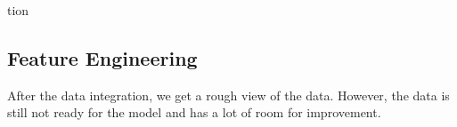 tion\documentclass[8pt]{article}
\begin{document}


\subsection{Feature Engineering}
After the data integration, we get a rough view of the data. However, the data is still not ready for the model and has a lot of room for improvement.
\end{document}
